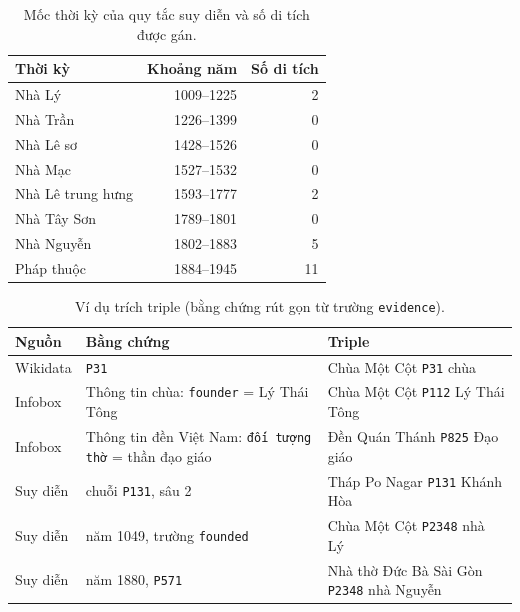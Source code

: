 \begin{table}[!htb]
\centering
\caption{Mốc thời kỳ của quy tắc suy diễn và số di tích được gán.}
\label{tab:app-periods}
\footnotesize
\begin{tabular}{@{}lrr@{}}
\toprule
Thời kỳ & Khoảng năm & Số di tích \\
\midrule
Nhà Lý & 1009--1225 & 2 \\
Nhà Trần & 1226--1399 & 0 \\
Nhà Lê sơ & 1428--1526 & 0 \\
Nhà Mạc & 1527--1532 & 0 \\
Nhà Lê trung hưng & 1593--1777 & 2 \\
Nhà Tây Sơn & 1789--1801 & 0 \\
Nhà Nguyễn & 1802--1883 & 5 \\
Pháp thuộc & 1884--1945 & 11 \\
\bottomrule
\end{tabular}
\end{table}

\begin{table}[!htb]
\centering
\caption{Ví dụ trích triple (bằng chứng rút gọn từ trường \texttt{evidence}).}
\label{tab:app-extract}
\scriptsize
\setlength{\tabcolsep}{3pt}
\begin{tabular}{@{}p{1.0cm}>{\raggedright\arraybackslash}p{3.6cm}>{\raggedright\arraybackslash}p{3.7cm}@{}}
\toprule
Nguồn & Bằng chứng & Triple \\
\midrule
Wikidata & \texttt{P31} & Chùa Một Cột \texttt{P31} chùa \\
Infobox & Thông tin chùa: \texttt{founder} = Lý Thái Tông & Chùa Một Cột \texttt{P112} Lý Thái Tông \\
Infobox & Thông tin đền Việt Nam: \texttt{đối tượng thờ} = thần đạo giáo & Đền Quán Thánh \texttt{P825} Đạo giáo \\
Suy diễn & chuỗi \texttt{P131}, sâu 2 & Tháp Po Nagar \texttt{P131} Khánh Hòa \\
Suy diễn & năm 1049, trường \texttt{founded} & Chùa Một Cột \texttt{P2348} nhà Lý \\
Suy diễn & năm 1880, \texttt{P571} & Nhà thờ Đức Bà Sài Gòn \texttt{P2348} nhà Nguyễn \\
\bottomrule
\end{tabular}
\end{table}


